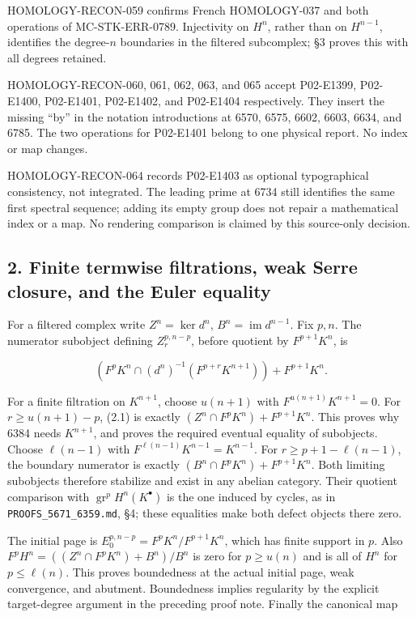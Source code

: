 HOMOLOGY-RECON-059 confirms French HOMOLOGY-037 and both operations of MC-STK-ERR-0789. Injectivity on \(H^n\), rather than on \(H^{n-1}\), identifies the degree-\(n\) boundaries in the filtered subcomplex; §3 proves this with all degrees retained.

HOMOLOGY-RECON-060, 061, 062, 063, and 065 accept P02-E1399, P02-E1400, P02-E1401, P02-E1402, and P02-E1404 respectively. They insert the missing ``by'' in the notation introductions at 6570, 6575, 6602, 6603, 6634, and 6785. The two operations for P02-E1401 belong to one physical report. No index or map changes.

HOMOLOGY-RECON-064 records P02-E1403 as optional typographical consistency, not integrated. The leading prime at 6734 still identifies the same first spectral sequence; adding its empty group does not repair a mathematical index or a map. No rendering comparison is claimed by this source-only decision.

\subsection{2. Finite termwise filtrations, weak Serre closure, and the Euler equality}\label{note-07-finite-termwise-filtrations-weak-serre-closure-and-the-euler-equality}

For a filtered complex write \(Z^n=\ker d^n\), \(B^n=\operatorname{im}d^{n-1}\). Fix \(p,n\). The numerator subobject defining \(Z_r^{p,n-p}\), before quotient by \(F^{p+1}K^n\), is

\[
(F^pK^n\cap(d^n)^{-1}(F^{p+r}K^{n+1}))+F^{p+1}K^n. \tag{2.1}
\]

For a finite filtration on \(K^{n+1}\), choose \(u(n+1)\) with \(F^{u(n+1)}K^{n+1}=0\). For \(r\geq u(n+1)-p\), (2.1) is exactly \((Z^n\cap F^pK^n)+F^{p+1}K^n\). This proves why 6384 needs \(K^{n+1}\), and proves the required eventual equality of subobjects. Choose \(\ell(n-1)\) with \(F^{\ell(n-1)}K^{n-1}=K^{n-1}\). For \(r\geq p+1-\ell(n-1)\), the boundary numerator is exactly \((B^n\cap F^pK^n)+F^{p+1}K^n\). Both limiting subobjects therefore stabilize and exist in any abelian category. Their quotient comparison with \(\operatorname{gr}^pH^n(K^\bullet)\) is the one induced by cycles, as in \texttt{PROOFS\_5671\_6359.md}, §4; these equalities make both defect objects there zero.

The initial page is \(E_0^{p,n-p}=F^pK^n/F^{p+1}K^n\), which has finite support in \(p\). Also \(F^pH^n=((Z^n\cap F^pK^n)+B^n)/B^n\) is zero for \(p\geq u(n)\) and is all of \(H^n\) for \(p\leq\ell(n)\). This proves boundedness at the actual initial page, weak convergence, and abutment. Boundedness implies regularity by the explicit target-degree argument in the preceding proof note. Finally the canonical map

